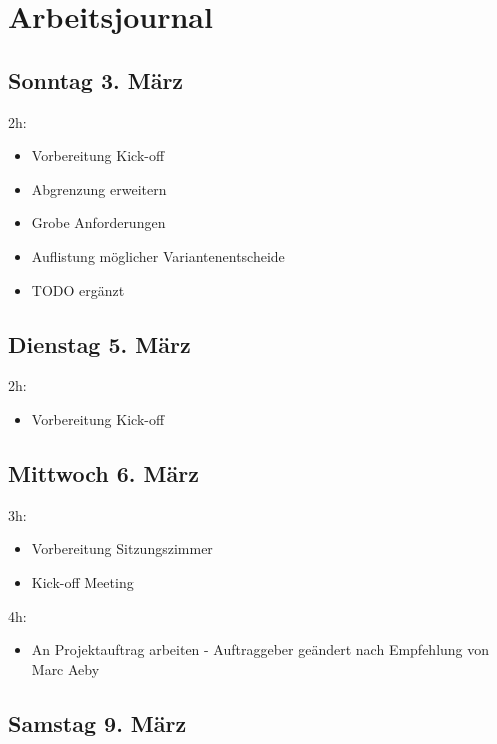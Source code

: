 \chapter{Arbeitsjournal}

\label{AppendixArbeitsjournal}

\section{Sonntag 3. März}\label{sonntag-3.-muxe4rz}

2h:

\begin{itemize}
\tightlist
\item
  Vorbereitung Kick-off
\item
  Abgrenzung erweitern
\item
  Grobe Anforderungen
\item
  Auflistung möglicher Variantenentscheide
\item
  TODO ergänzt
\end{itemize}

\section{Dienstag 5. März}\label{dienstag-5.muxe4rz}

2h:

\begin{itemize}
\tightlist
\item
  Vorbereitung Kick-off
\end{itemize}

\section{Mittwoch 6. März}\label{mittwoch-6.muxe4rz}

3h:

\begin{itemize}
\tightlist
\item
  Vorbereitung Sitzungszimmer
\item
  Kick-off Meeting
\end{itemize}

4h:

\begin{itemize}
\tightlist
\item
  An Projektauftrag arbeiten - Auftraggeber geändert nach Empfehlung
  von Marc Aeby
\end{itemize}

\section{Samstag 9. März}\label{samstag-9.muxe4rz}

